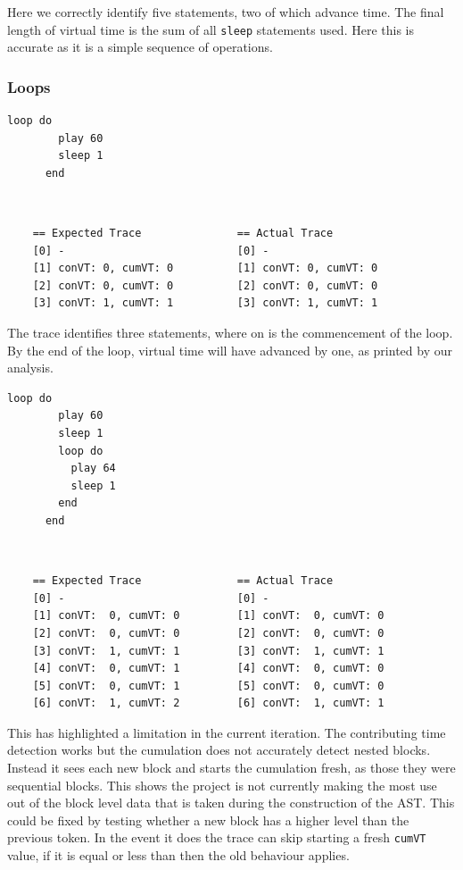 \documentclass[11pt, abstracton, twoside, titlepage=true]{scrartcl}
\begin{document}
Here we correctly identify five statements, two of which advance time. The final 
length of virtual time is the sum of all \texttt{sleep} statements used. Here this 
is accurate as it is a simple sequence of operations.

\subsubsection{Loops}
\begin{minipage}{\textwidth}
	\begin{lstlisting}[style = sonicpi]
      loop do
        play 60
        sleep 1
      end
	\end{lstlisting}
\end{minipage}
\\
\begin{lstlisting}
    == Expected Trace               == Actual Trace
    [0] -                           [0] -
    [1] conVT: 0, cumVT: 0          [1] conVT: 0, cumVT: 0
    [2] conVT: 0, cumVT: 0          [2] conVT: 0, cumVT: 0
    [3] conVT: 1, cumVT: 1          [3] conVT: 1, cumVT: 1
\end{lstlisting}

The trace identifies three statements, where on is the commencement of the loop. 
By the end of the loop, virtual time will have advanced by one, as printed by 
our analysis.

\begin{minipage}{\textwidth}
	\begin{lstlisting}[style = sonicpi]
      loop do
        play 60
        sleep 1
        loop do
          play 64
          sleep 1
        end
      end
	\end{lstlisting}
\end{minipage}
\\
\begin{lstlisting}
    == Expected Trace               == Actual Trace
    [0] -                           [0] -
    [1] conVT:  0, cumVT: 0         [1] conVT:  0, cumVT: 0
    [2] conVT:  0, cumVT: 0         [2] conVT:  0, cumVT: 0
    [3] conVT:  1, cumVT: 1         [3] conVT:  1, cumVT: 1
    [4] conVT:  0, cumVT: 1         [4] conVT:  0, cumVT: 0
    [5] conVT:  0, cumVT: 1         [5] conVT:  0, cumVT: 0
    [6] conVT:  1, cumVT: 2         [6] conVT:  1, cumVT: 1
\end{lstlisting}

This has highlighted a limitation in the current iteration. The contributing time 
detection works but the cumulation does not accurately detect nested blocks. 
Instead it sees each new block and starts the cumulation fresh, as those they were
sequential blocks. This shows the project is not currently making the most use out 
of the block level data that is taken during the construction of the AST. This could 
be fixed by testing whether a new block has a higher level than the previous token.
In the event it does the trace can skip starting a fresh \texttt{cumVT} value, if it 
is equal or less than then the old behaviour applies. 
\end{document}
